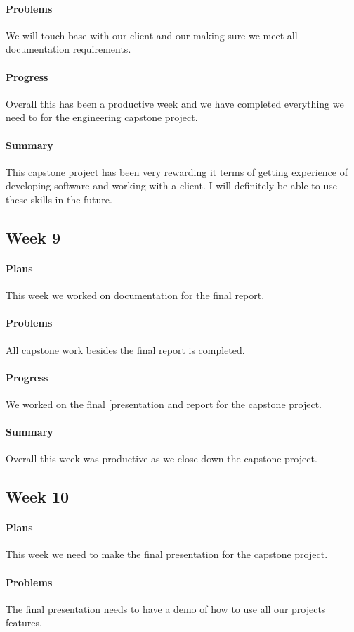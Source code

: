 \documentclass{article}
\begin{document}
\paragraph{Problems}
We will touch base with our client and our making sure we meet all documentation requirements. 
\paragraph{Progress}
Overall this has been a productive week and we have completed everything we need to for the engineering capstone project. 
\paragraph{Summary}
This capstone project has been very rewarding it terms of getting experience of developing software and working with a client. I will definitely be able to use these skills in the future. 
\subsection{Week 9}
\paragraph{Plans}
This week we worked on documentation for the final report. 
\paragraph{Problems}
All capstone work besides the final report is completed.
\paragraph{Progress}
We worked on the final [presentation and report for the capstone project.
\paragraph{Summary}
Overall this week was productive as we close down the capstone project.
\subsection{Week 10}
\paragraph{Plans}
This week we need to make the final presentation for the capstone project.
\paragraph{Problems}
The final presentation needs to have a demo of how to use all our projects features.
\end{document}
